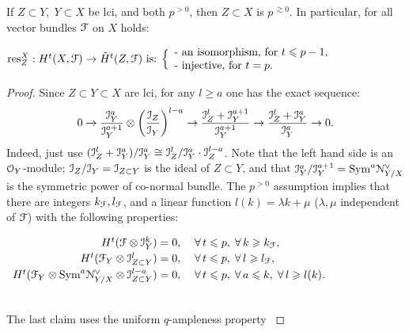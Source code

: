 \documentclass[11pt,reqno]{amsart}
\let\euf\EuScript
\let\tld\tilde
\numberwithin{equation}{section}
\numberwithin{figure}{section}
\let\l\lambda
\let\ges\geqslant
\let\les\leqslant
\begin{document}
\begin{m-proposition}\label{prop:approx-p}
If $Z\subset Y,\;Y\subset X$ be lci, and both $p^{{>0}}$, then $Z\subset X$ is $p^{{\,\gtrsim0}}$. 
In particular, for all vector bundles ${{\euf F}}$ on $X$ holds: 
\\[1ex] \centerline{
$
{{\rm res}}^X_{Z}:H^t(X,{{\euf F}})\to\tld H^t(Z,{{\euf F}})\text{ is: }
\Big\{\begin{array}{l}
\text{- an isomorphism, for }t\les p-1,\\ 
\text{- injective, for }t=p.
\end{array}\Big.
$
}
\end{m-proposition}

\begin{proof}
Since $Z\subset Y\subset X$ are lci, for any $l\ges a$ one has the exact sequence:
\begin{equation}\label{eq:la}
0\to
\frac{{{\euf I}}_Y^a}{{{\euf I}}_Y^{a+1}}\otimes\biggl(\frac{{{\euf I}}_Z}{{{\euf I}}_Y}\biggr)^{l-a}
\to
\frac{{{\euf I}}_Z^l+{{\euf I}}_Y^{a+1}}{{{\euf I}}_Y^{a+1}}
\to
\frac{{{\euf I}}_Z^l+{{\euf I}}_Y^{a}}{{{\euf I}}_Y^{a}}
\to0.
\end{equation}
Indeed, just use 
$({{\euf I}}_Z^l+{{\euf I}}_Y^{a})/{{{\euf I}}_Y^{a}}\cong{{\euf I}}_Z^{l}/{{\euf I}}_Y^a\cdot{{\euf I}}_Z^{l-a}$. 
Note that the left hand side is an ${{\euf O}}_Y$-module; 
${{\euf I}}_Z/{{\euf I}}_Y={{\euf I}}_{Z\subset Y}$ is the ideal of $Z\subset Y$, and 
that ${{\euf I}}_Y^a/{{\euf I}}_Y^{a+1}={\mathop{\rm Sym}\nolimits}^a{{\euf N}}_{Y/X}^\vee$ is the symmetric power 
of co-normal bundle. 
The $p^{{>0}}$ assumption implies that there are integers $k_{{\euf F}},l_{{\euf F}}$, 
and a linear function $l(k)=\l k+\mu$ ($\l,\mu$ independent of ${{\euf F}}$) 
with the following properties: 
\\[1ex] \centerline{
$
\begin{array}{rl}
H^t({{\euf F}}\otimes{{\euf I}}_{Y}^k)=0,
&
\;\forall\,t\les p,\;\forall\,k\ges k_{{\euf F}},
\\[.5ex]
H^t({{\euf F}}_Y\otimes{{\euf I}}_{Z\subset Y}^{l})=0,
&
\;\forall\,t\les p,\;\forall\,l\ges l_{{\euf F}},
\\[.5ex] 
H^t({{\euf F}}_Y\otimes{\mathop{\rm Sym}\nolimits}^a{{\euf N}}_{Y/X}^\vee\otimes{{\euf I}}_{Z\subset Y}^{l-a})=0,
&
\;\forall\,t\les p,\;\forall\,a\les k,\;\forall\,l\ges l(k).
\end{array}
$
}\\[1ex]
The last claim uses the uniform $q$-ampleness property \cite[Theorem 6.4]{to} 

\end{proof}
\end{document}

